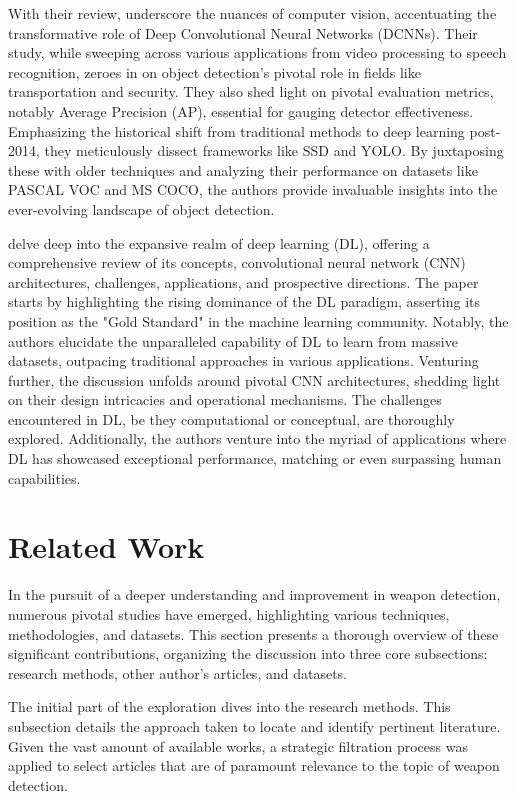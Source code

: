 With their review, \citet{rfc9} underscore the nuances of computer vision, accentuating the transformative role of Deep Convolutional Neural Networks (DCNNs). Their study, while sweeping across various applications from video processing to speech recognition, zeroes in on object detection's pivotal role in fields like transportation and security. They also shed light on pivotal evaluation metrics, notably Average Precision (AP), essential for gauging detector effectiveness. Emphasizing the historical shift from traditional methods to deep learning post-2014, they meticulously dissect frameworks like SSD and YOLO. By juxtaposing these with older techniques and analyzing their performance on datasets like PASCAL VOC and MS COCO, the authors provide invaluable insights into the ever-evolving landscape of object detection.

\citet{rfc10} delve deep into the expansive realm of deep learning (DL), offering a comprehensive review of its concepts, convolutional neural network (CNN) architectures, challenges, applications, and prospective directions. The paper starts by highlighting the rising dominance of the DL paradigm, asserting its position as the "Gold Standard" in the machine learning community. Notably, the authors elucidate the unparalleled capability of DL to learn from massive datasets, outpacing traditional approaches in various applications. Venturing further, the discussion unfolds around pivotal CNN architectures, shedding light on their design intricacies and operational mechanisms. The challenges encountered in DL, be they computational or conceptual, are thoroughly explored. Additionally, the authors venture into the myriad of applications where DL has showcased exceptional performance, matching or even surpassing human capabilities.

\section{Related Work}
In the pursuit of a deeper understanding and improvement in weapon detection, numerous pivotal studies have emerged, highlighting various techniques, methodologies, and datasets. This section presents a thorough overview of these significant contributions, organizing the discussion into three core subsections: research methods, other author's articles, and datasets.

The initial part of the exploration dives into the research methods. This subsection details the approach taken to locate and identify pertinent literature. Given the vast amount of available works, a strategic filtration process was applied to select articles that are of paramount relevance to the topic of weapon detection.

